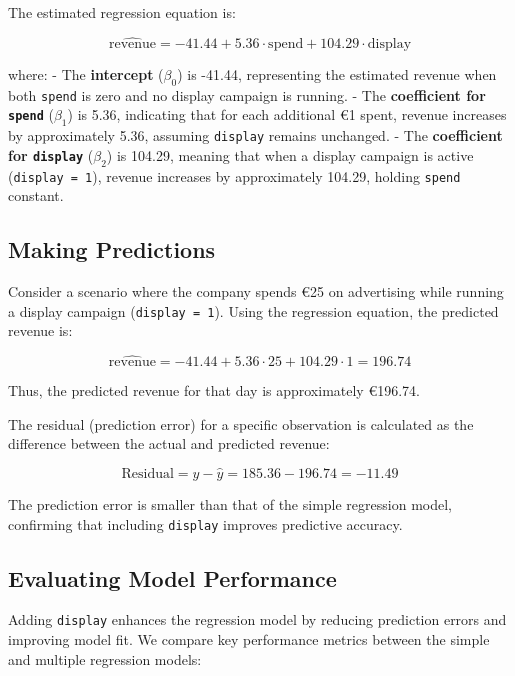 \documentclass[
  11pt,
]{book}
\newcommand{\passthrough}[1]{#1}
\theoremstyle{definition}
\theoremstyle{definition}
\theoremstyle{definition}
\theoremstyle{definition}
\theoremstyle{remark}
\begin{document}
The estimated regression equation is:

\[
\hat{\text{revenue}} = -41.44 + 5.36 \cdot \text{spend} + 104.29 \cdot \text{display}
\]

where:
- The \textbf{intercept} (\(\beta_0\)) is -41.44, representing the estimated revenue when both \passthrough{\lstinline!spend!} is zero and no display campaign is running.
- The \textbf{coefficient for \passthrough{\lstinline!spend!}} (\(\beta_1\)) is 5.36, indicating that for each additional €1 spent, revenue increases by approximately 5.36, assuming \passthrough{\lstinline!display!} remains unchanged.
- The \textbf{coefficient for \passthrough{\lstinline!display!}} (\(\beta_2\)) is 104.29, meaning that when a display campaign is active (\passthrough{\lstinline!display = 1!}), revenue increases by approximately 104.29, holding \passthrough{\lstinline!spend!} constant.

\subsection*{Making Predictions}\label{making-predictions}


Consider a scenario where the company spends €25 on advertising while running a display campaign (\passthrough{\lstinline!display = 1!}). Using the regression equation, the predicted revenue is:

\[
\hat{\text{revenue}} = -41.44 + 5.36 \cdot 25 + 104.29 \cdot 1 = 196.74
\]

Thus, the predicted revenue for that day is approximately €196.74.

The residual (prediction error) for a specific observation is calculated as the difference between the actual and predicted revenue:

\[
\text{Residual} = y - \hat{y} = 185.36 - 196.74 = -11.49
\]

The prediction error is smaller than that of the simple regression model, confirming that including \passthrough{\lstinline!display!} improves predictive accuracy.

\subsection*{Evaluating Model Performance}\label{evaluating-model-performance}


Adding \passthrough{\lstinline!display!} enhances the regression model by reducing prediction errors and improving model fit. We compare key performance metrics between the simple and multiple regression models:
\end{document}
